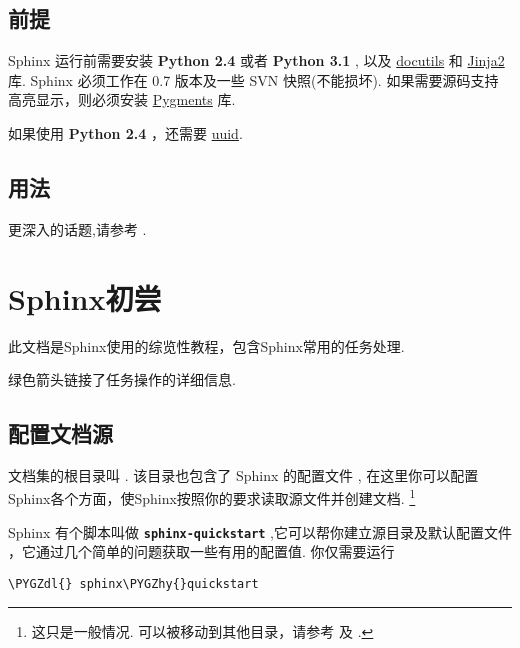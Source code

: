 \documentclass[letterpaper,10pt,english]{sphinxmanual}
\def\PYGZdl{\char`\$}
\def\PYGZhy{\char`\-}
\begin{document}
\section{前提}
\label{intro:id4}
Sphinx 运行前需要安装 \textbf{Python 2.4} 或者 \textbf{Python 3.1} , 以及
\href{http://docutils.sf.net/}{docutils} 和 \href{http://jinja.pocoo.org/}{Jinja2} 库.  Sphinx 必须工作在 0.7 版本及一些 SVN 快照(不能损坏).
如果需要源码支持高亮显示，则必须安装 \href{http://pygments.org/}{Pygments} 库.

如果使用 \textbf{Python 2.4} ，还需要 \href{http://pypi.python.org/pypi/uuid/}{uuid}.


\section{用法}
\label{intro:uuid}\label{intro:id5}
更深入的话题,请参考 {\hyperref[tutorial::doc]{}} .


\chapter{Sphinx初尝}
\label{tutorial:sphinx}\label{tutorial::doc}
此文档是Sphinx使用的综览性教程，包含Sphinx常用的任务处理.

绿色箭头链接了任务操作的详细信息.


\section{配置文档源}
\label{tutorial:id1}
文档集的根目录叫 {\hyperref[glossary:term\string-source\string-directory]{}}.  该目录也包含了 Sphinx 的配置文件 , 在这里你可以配置Sphinx各个方面，使Sphinx按照你的要求读取源文件并创建文档.  \footnote[1]{\sphinxAtStartFootnote%
这只是一般情况.  可以被移动到其他目录，请参考 {\hyperref[glossary:term\string-configuration\string-directory]{}} 及 {\hyperref[invocation:invocation]{}} .
}

Sphinx 有个脚本叫做 \textbf{\texttt{sphinx-quickstart}} ,它可以帮你建立源目录及默认配置文件  ，它通过几个简单的问题获取一些有用的配置值.
你仅需要运行

\begin{Verbatim}[commandchars=\\\{\}]
\PYGZdl{} sphinx\PYGZhy{}quickstart
\end{Verbatim}
\end{document}
